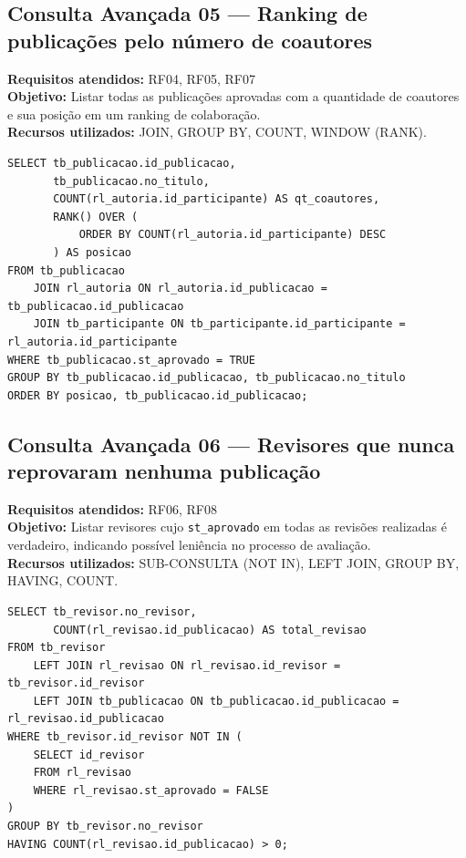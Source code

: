 \documentclass[12pt]{article}
\begin{document}
\subsection{Consulta Avançada 05 --- Ranking de publicações pelo número de coautores}
\textbf{Requisitos atendidos:} RF04, RF05, RF07 \\
\textbf{Objetivo:} Listar todas as publicações aprovadas com a quantidade de coautores e sua posição em um ranking de colaboração. \\
\textbf{Recursos utilizados:} JOIN, GROUP BY, COUNT, WINDOW (RANK).
\begin{lstlisting}[caption={QA05 --- Ranking de publicações pelo número de coautores.}]
SELECT tb_publicacao.id_publicacao,
       tb_publicacao.no_titulo,
       COUNT(rl_autoria.id_participante) AS qt_coautores,
       RANK() OVER (
           ORDER BY COUNT(rl_autoria.id_participante) DESC
       ) AS posicao
FROM tb_publicacao
    JOIN rl_autoria ON rl_autoria.id_publicacao = tb_publicacao.id_publicacao
    JOIN tb_participante ON tb_participante.id_participante = rl_autoria.id_participante
WHERE tb_publicacao.st_aprovado = TRUE
GROUP BY tb_publicacao.id_publicacao, tb_publicacao.no_titulo
ORDER BY posicao, tb_publicacao.id_publicacao;
\end{lstlisting}

\subsection{Consulta Avançada 06 --- Revisores que nunca reprovaram nenhuma publicação}
\textbf{Requisitos atendidos:} RF06, RF08 \\
\textbf{Objetivo:} Listar revisores cujo \texttt{st\_aprovado} em todas as revisões realizadas é verdadeiro, indicando possível leniência no processo de avaliação. \\
\textbf{Recursos utilizados:} SUB-CONSULTA (NOT IN), LEFT JOIN, GROUP BY, HAVING, COUNT.
\begin{lstlisting}[caption={QA06 --- Revisores que nunca reprovaram nenhuma publicação.}]
SELECT tb_revisor.no_revisor,
       COUNT(rl_revisao.id_publicacao) AS total_revisao
FROM tb_revisor
    LEFT JOIN rl_revisao ON rl_revisao.id_revisor = tb_revisor.id_revisor
    LEFT JOIN tb_publicacao ON tb_publicacao.id_publicacao = rl_revisao.id_publicacao
WHERE tb_revisor.id_revisor NOT IN (
    SELECT id_revisor
    FROM rl_revisao
    WHERE rl_revisao.st_aprovado = FALSE
)
GROUP BY tb_revisor.no_revisor
HAVING COUNT(rl_revisao.id_publicacao) > 0;
\end{lstlisting}
\end{document}
